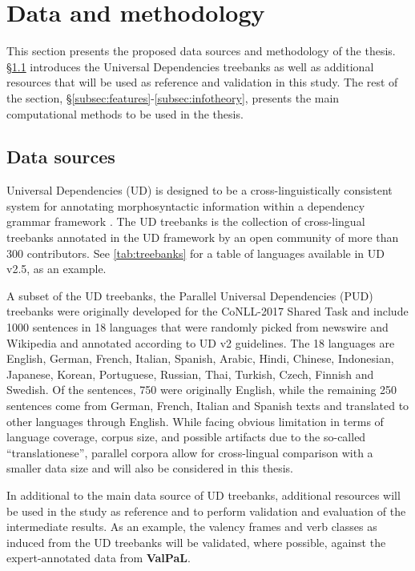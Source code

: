 \section{Data and methodology}\label{sec:methodology}

This section presents the proposed data sources and methodology of the thesis. \S\ref{subsec:data-sources} introduces the Universal Dependencies treebanks as well as additional resources that will be used as reference and validation in this study. The rest of the section, \S\ref{subsec:features}-\ref{subsec:infotheory}, presents the main computational methods to be used in the thesis.

\subsection{Data sources}\label{subsec:data-sources}

Universal Dependencies (UD) is designed to be a cross-linguistically consistent system for annotating morphosyntactic information within a dependency grammar framework \citep{demarneffe2021}. The UD treebanks \citep{universaldep} is the collection of cross-lingual treebanks annotated in the UD framework by an open community of more than 300 contributors. See \ref{tab:treebanks} for a table of languages available in UD v2.5, as an example. 



A subset of the UD treebanks, the Parallel Universal Dependencies (PUD) treebanks were originally developed for the CoNLL-2017 Shared Task \citep{zeman2017} and include 1000 sentences in 18 languages that were randomly picked from newswire and Wikipedia and annotated according to UD v2 guidelines. The 18 languages are English, German, French, Italian, Spanish, Arabic, Hindi, Chinese, Indonesian, Japanese, Korean, Portuguese, Russian, Thai, Turkish, Czech, Finnish and Swedish. Of the sentences, 750 were originally English, while the remaining 250 sentences come from German, French, Italian and Spanish texts and translated to other languages through English. While facing obvious limitation in terms of language coverage, corpus size, and possible artifacts due to the so-called ``translationese'', parallel corpora allow for cross-lingual comparison with a smaller data size and will also be considered in this thesis.

In additional to the main data source of UD treebanks, additional resources will be used in the study as reference and to perform validation and evaluation of the intermediate results. As an example, the valency frames and verb classes as induced from the UD treebanks will be validated, where possible, against the expert-annotated data from \textbf{ValPaL}\citep{valpal}. 

